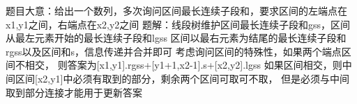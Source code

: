 题目大意：给出一个数列，多次询问区间最长连续子段和，要求区间的左端点在x1,y1之间，右端点在x2,y2之间
题解：线段树维护区间最长连续子段和gss，区间从最左元素开始的最长连续子段和lgss
区间以最右元素为结尾的最长连续子段和rgss以及区间和s，信息传递并合并即可
考虑询问区间的特殊性，如果两个端点区间不相交，
则答案为[x1,y1].rgss+[y1+1,x2-1].s+[x2,y2].lgss
如果区间相交，则中间区间[x2,y1]中必须有取到的部分，剩余两个区间可取可不取，
但是必须与中间取到部分连接才能用于更新答案